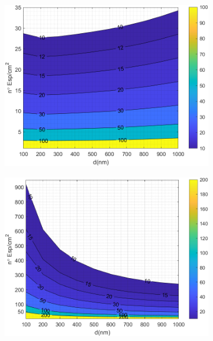 \begin{figure}[H]
		\begin{subfigure}[b]{0.49\textwidth}
		\centering
		\includegraphics[width=1.00\textwidth]{figuras/Resultados/RelacionCondRad/SiGe_full.png}
		\caption{ }
		\label{fig:rel_SiSiO2Ge_full}
	\end{subfigure}
		\hfill
		\begin{subfigure}[b]{0.49\textwidth}
			\centering
			\includegraphics[width=1.00\textwidth]{figuras/Resultados/RelacionCondRad/SiGe_Rc_full_10.png}
			\caption{ }
			\label{fig:rel_SiSiO2Ge_Rc_full}
		\end{subfigure}

\end{figure}
